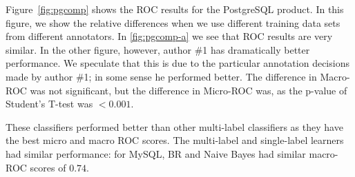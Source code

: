 \documentclass[smallextended]{svjour3}       %
\begin{document}
Figure~\ref{fig:pgcomp} shows the ROC results for the PostgreSQL
product. In this figure, we show the relative differences when we use
different training data sets from different annotators. In \ref{fig:pgcomp-a} we see that ROC
results are very similar. In the other figure, however, author \#1 has
dramatically better performance. We speculate that this is due to the
particular annotation decisions made by author \#1; in some sense he
performed better. 
The difference in Macro-ROC was not significant, but the difference in
Micro-ROC was, as the p-value of Student's T-test was $< 0.001$. 

These classifiers performed better than other multi-label classifiers as they have the best micro and macro ROC scores. 
The multi-label and single-label learners had similar performance: for
MySQL, BR and Naive Bayes had similar macro-ROC scores of $0.74$.
\end{document}
